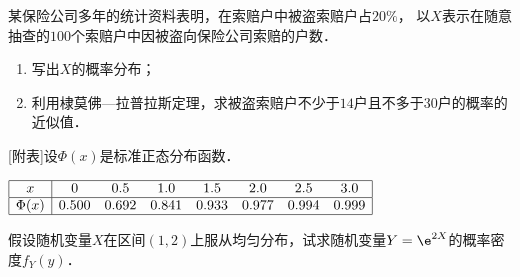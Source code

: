 \documentclass[plain,noanswer,medmath]{../../template/jnuexam}
\begin{document}

\begin{problem}
某保险公司多年的统计资料表明，在索赔户中被盗索赔户占$20\%$，
以$X$表示在随意抽查的$100$个索赔户中因被盗向保险公司索赔的户数．
\begin{enumerate}
\item 写出$X$的概率分布；
\item 利用棣莫佛—拉普拉斯定理，求被盗索赔户不少于$14$户且不多于$30$户的概率的近似值．
\end{enumerate}
\centerline{[附表]设$\Phi(x)$是标准正态分布函数．}%
\noindent\centerline{$\begin{array}{|c|ccccccc|}
\hline
        x &     0 &   0.5 &   1.0 &   1.5 &   2.0 &   2.5 & 3.0 \\
\hline
  \Phi(x) & 0.500 & 0.692 & 0.841 & 0.933 & 0.977 & 0.994 & 0.999 \\
\hline
\end{array}$}
\end{problem}



\begin{problem}
假设随机变量$X$在区间$(1,2)$上服从均匀分布，试求随机变量$Y = \e^{2X}$的概率密度$f_Y(y)$．
\end{problem}
\end{document}
